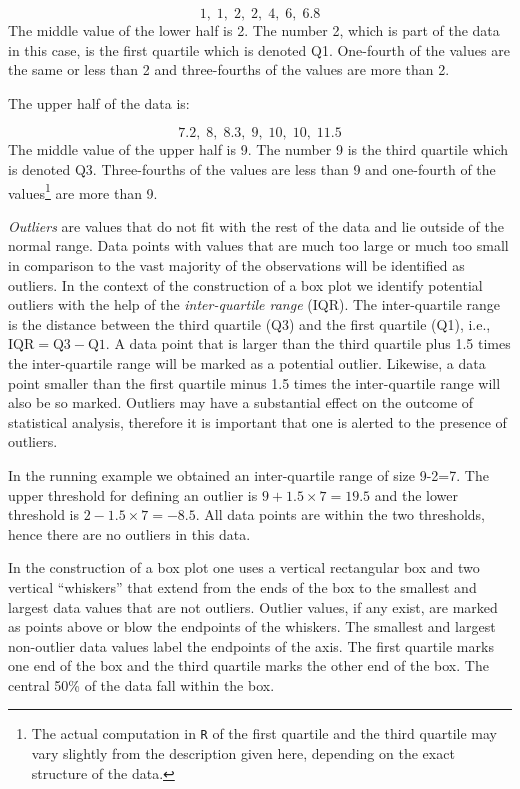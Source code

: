 \documentclass[
]{krantz}
\theoremstyle{definition}
\theoremstyle{definition}
\theoremstyle{definition}
\theoremstyle{remark}
\begin{document}
\[1,\;   1,\;   2,\;   2,\;   4,\;   6,\;   6.8\] The middle value of
the lower half is 2. The number 2, which is part of the data in this
case, is the first quartile which is denoted Q1. One-fourth of the
values are the same or less than 2 and three-fourths of the values are
more than 2.

The upper half of the data is:

\[7.2,\;   8,\;   8.3,\;   9,\;   10,\;   10,\;   11.5\] The middle
value of the upper half is 9. The number 9 is the third quartile which
is denoted Q3. Three-fourths of the values are less than 9 and
one-fourth of the values\footnote{The actual computation in \texttt{R} of the first quartile and the third
  quartile may vary slightly from the description given here,
  depending on the exact structure of the data.} are more than 9.

\emph{Outliers} are values that do not fit with the rest of the data and lie
outside of the normal range. Data points with values that are much too
large or much too small in comparison to the vast majority of the
observations will be identified as outliers. In the context of the
construction of a box plot we identify potential outliers with the help
of the \emph{inter-quartile range} (IQR). The inter-quartile range is the
distance between the third quartile (Q3) and the first quartile (Q1),
i.e., \(\mbox{IQR} = \mbox{Q3} - \mbox{Q1}\). A data point that is larger
than the third quartile plus 1.5 times the inter-quartile range will be
marked as a potential outlier. Likewise, a data point smaller than the
first quartile minus 1.5 times the inter-quartile range will also be so
marked. Outliers may have a substantial effect on the outcome of
statistical analysis, therefore it is important that one is alerted to
the presence of outliers.

In the running example we obtained an inter-quartile range of size
9-2=7. The upper threshold for defining an outlier is
\(9+1.5 \times 7 = 19.5\) and the lower threshold is
\(2-1.5 \times 7 = -8.5\). All data points are within the two thresholds,
hence there are no outliers in this data.

In the construction of a box plot one uses a vertical rectangular box
and two vertical ``whiskers'' that extend from the ends of the box to the
smallest and largest data values that are not outliers. Outlier values,
if any exist, are marked as points above or blow the endpoints of the
whiskers. The smallest and largest non-outlier data values label the
endpoints of the axis. The first quartile marks one end of the box and
the third quartile marks the other end of the box. The central 50\% of
the data fall within the box.
\end{document}
